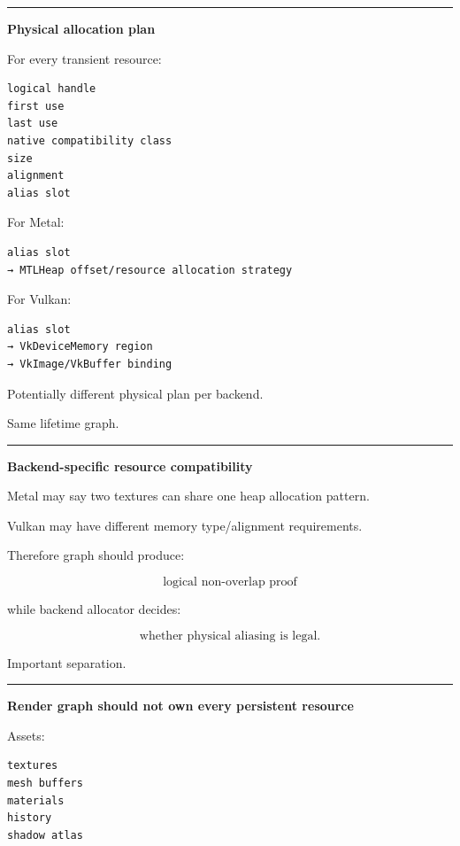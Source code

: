 \begin{center}\rule{0.5\linewidth}{0.5pt}\end{center}

\textbf{Physical allocation plan}

For every transient resource:

\begin{verbatim}
logical handle
first use
last use
native compatibility class
size
alignment
alias slot
\end{verbatim}

For Metal:

\begin{verbatim}
alias slot
→ MTLHeap offset/resource allocation strategy
\end{verbatim}

For Vulkan:

\begin{verbatim}
alias slot
→ VkDeviceMemory region
→ VkImage/VkBuffer binding
\end{verbatim}

Potentially different physical plan per backend.

Same lifetime graph.

\begin{center}\rule{0.5\linewidth}{0.5pt}\end{center}

\textbf{Backend-specific resource compatibility}

Metal may say two textures can share one heap allocation pattern.

Vulkan may have different memory type/alignment requirements.

Therefore graph should produce:

\[
\boxed{
\text{logical non-overlap proof}
}
\]

while backend allocator decides:

\[
\boxed{
\text{whether physical aliasing is legal}.
}
\]

Important separation.

\begin{center}\rule{0.5\linewidth}{0.5pt}\end{center}

\textbf{Render graph should not own every persistent resource}

Assets:

\begin{verbatim}
textures
mesh buffers
materials
history
shadow atlas
\end{verbatim}

